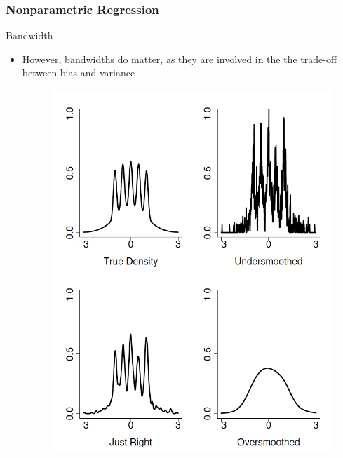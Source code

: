 \documentclass{beamer}
\begin{document}
\begin{frame}
\frametitle{Nonparametric Regression}
Bandwidth
\begin{itemize}
\item However, bandwidths do matter, as they are involved in the the trade-off between bias and variance
\begin{figure}[H]
\centering
\includegraphics[height=0.75\textheight, keepaspectratio]{smoothing.png}
\end{figure}
\end{itemize}
\end{frame}
\end{document}

